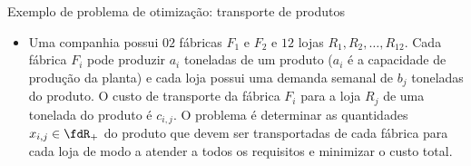 \begin{frame}{Exemplo de problema de otimização: transporte de produtos~\cite{Nocedal2006}}
  \begin{itemize}\footnotesize
    \item Uma companhia possui $ 02 $ fábricas $ F_1 $ e $ F_2 $ e $ 12 $ lojas $ R_1, R_2, \ldots, R_{12} $. Cada
      fábrica $ F_i $ pode produzir $ a_i $ toneladas de um produto ($ a_i $ é a capacidade de produção da planta) e cada loja possui uma demanda semanal de $ b_j $ toneladas do produto. O custo de transporte da fábrica $ F_i $ para a loja $ R_j $ de uma tonelada do produto é $ c_{i,j} $. O problema é determinar as quantidades $ x_{i,j} \in \fdR_{+} $ do produto que devem ser transportadas de cada fábrica para cada loja de modo a atender a todos os requisitos e minimizar o custo total. %
  \end{itemize}
\end{frame}

